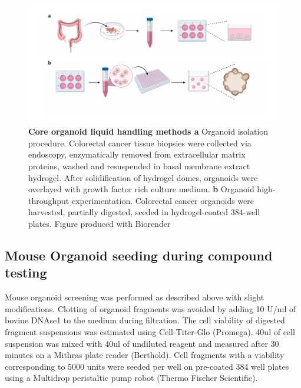 \begin{flushleft}
\begin{figure}[h!]
\centering
\includegraphics[width=\textwidth,
                height=\textheight,
                keepaspectratio]{figures/promise/pdf/fig_0_1.pdf}
\caption[Core organoid liquid handling methods]{\textbf{Core organoid liquid handling methods a} Organoid isolation procedure. Colorectal cancer tissue biopsies were collected via endoscopy, enzymatically removed from extracellular matrix proteins, washed and resuspended in basal membrane extract hydrogel. After solidification of hydrogel domes, organoids were overlayed with growth factor rich culture medium. \textbf{b} Organoid high-throughput experimentation. Colorectal cancer organoids were harvested, partially digested, seeded in hydrogel-coated 384-well plates. Figure produced with Biorender}
\label{fig_110}
\end{figure}

\subsection{Mouse Organoid seeding during compound testing}
Mouse organoid screening was performed as described above with slight modifications. Clotting of organoid fragments was avoided by adding 10 U/ml of bovine DNAse1 to the medium during filtration. The cell viability of digested fragment suspensions was estimated using Cell-Titer-Glo (Promega). 40ul of cell suspension was mixed with 40ul of undiluted reagent and measured after 30 minutes on a Mithras plate reader (Berthold). Cell fragments with a viability corresponding to 5000 units were seeded per well on pre-coated 384 well plates using a Multidrop peristaltic pump robot (Thermo Fischer Scientific). 


\end{flushleft}

